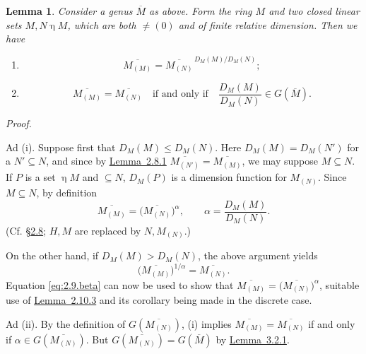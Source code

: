 \documentclass[b5paper,twoside]{article}
\newcommand{\secref}[2]{\hyperref[#1]{\mbox{\S#2}}}
\newcommand{\lemref}[2]{\hyperref[#1]{\mbox{Lemma~#2}}}
\theoremstyle{mvnplain}
\newtheorem{lemma}{Lemma}[section]
\renewenvironment{proof}[1][Proof]{%
  \par\addvspace{0.35\baselineskip}%
  \noindent\textit{#1.}\ \normalfont\ignorespaces
}{%
  \par\addvspace{0.35\baselineskip}%
}
\newcommand{\M}{\mathbf M}
\newcommand{\Hilbert}{\mathfrak H}
\def\M{M}%
\def\Hilbert{H}%
\def\widetilde#1{#1}%
\def\mathfrak#1{#1}%
\begin{document}
\begin{lemma}\label{lem:3.2.2}
Consider a genus \(\widetilde{\overline{\M}}\) as above. Form the ring
\(\M\) and two closed linear sets \(\mathfrak M,\mathfrak N\mathrel{\eta}\M\), which
are both \(\ne(0)\) and of finite relative dimension. Then we have
\begin{enumerate}[label=(\roman*)]
\item
\[
  \overline{\M_{(\mathfrak M)}}
  =\overline{\M_{(\mathfrak N)}}^{\,D_{\M}(\mathfrak M)/D_{\M}(\mathfrak N)};
\]
\item
\[
  \overline{\M_{(\mathfrak M)}}=\overline{\M_{(\mathfrak N)}}
  \quad\text{if and only if}\quad
  \frac{D_{\M}(\mathfrak M)}{D_{\M}(\mathfrak N)}
  \in\mathfrak G(\widetilde{\overline{\M}}).
\]
\end{enumerate}
\end{lemma}

\begin{proof}
Ad (i). Suppose first that
\(D_{\M}(\mathfrak M)\leq D_{\M}(\mathfrak N)\). Here
\(D_{\M}(\mathfrak M)=D_{\M}(\mathfrak N')\) for a
\(\mathfrak N'\subseteq\mathfrak N\), and since by
\lemref{lem:2.8.1}{2.8.1}
\(\overline{\M_{(\mathfrak N')}}=\overline{\M_{(\mathfrak M)}}\), we may
suppose \(\mathfrak M\subseteq\mathfrak N\). If \(\mathfrak P\) is a set
\(\mathrel{\eta}\M\) and \(\subseteq\mathfrak N\), \(D_{\M}(\mathfrak P)\) is a
dimension function for \(\M_{(\mathfrak N)}\). Since
\(\mathfrak M\subseteq\mathfrak N\), by definition
\[
  \overline{\M_{(\mathfrak M)}}
  =\bigl(\overline{\M_{(\mathfrak N)}}\bigr)^\alpha,
  \qquad
  \alpha=\frac{D_{\M}(\mathfrak M)}{D_{\M}(\mathfrak N)}.
\]
(Cf. \secref{sec:2.8}{2.8}; \(\Hilbert,\M\) are replaced by
\(\mathfrak N,\M_{(\mathfrak N)}\).)

On the other hand, if
\(D_{\M}(\mathfrak M)>D_{\M}(\mathfrak N)\), the above argument yields
\[
  \bigl(\overline{\M_{(\mathfrak M)}}\bigr)^{1/\alpha}
  =\overline{\M_{(\mathfrak N)}}.
\]
Equation \eqref{eq:2.9.beta} can now be used to show that
\(\overline{\M_{(\mathfrak M)}}
=\bigl(\overline{\M_{(\mathfrak N)}}\bigr)^\alpha\), suitable use of
\lemref{lem:2.10.3}{2.10.3} and its corollary being made in the discrete case.

Ad (ii). By the definition of
\(\mathfrak G(\overline{\M_{(\mathfrak N)}})\), (i) implies
\(\overline{\M_{(\mathfrak M)}}=\overline{\M_{(\mathfrak N)}}\) if and
only if \(\alpha\in\mathfrak G(\overline{\M_{(\mathfrak N)}})\). But
\(\mathfrak G(\overline{\M_{(\mathfrak N)}})
=\mathfrak G(\widetilde{\overline{\M}})\) by
\lemref{lem:3.2.1}{3.2.1}.
\end{proof}
\end{document}
